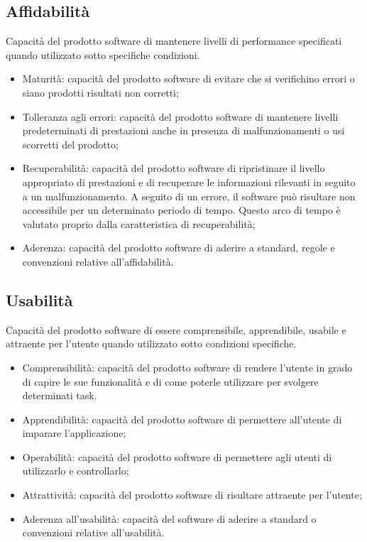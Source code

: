 \subsection{Affidabilità}
Capacità del prodotto software di mantenere livelli di performance specificati quando utilizzato sotto specifiche condizioni.

\begin{itemize}
    \item Maturità: capacità del prodotto software di evitare che si verifichino errori o siano prodotti risultati non corretti;
    \item Tolleranza agli errori: capacità del prodotto software di mantenere livelli predeterminati di prestazioni anche in presenza di malfunzionamenti o usi scorretti del prodotto;
    \item Recuperabilità: capacità del prodotto software di ripristinare il livello appropriato di prestazioni e di recuperare le informazioni rilevanti in seguito a un malfunzionamento. A seguito di un errore, il software può risultare non accessibile per un determinato periodo di tempo. Questo arco di tempo è valutato proprio dalla caratteristica di recuperabilità;
    \item Aderenza: capacità del prodotto software di aderire a standard, regole e convenzioni relative all'affidabilità.
\end{itemize}

\subsection{Usabilità}
Capacità del prodotto software di essere comprensibile, apprendibile, usabile e attraente per l'utente quando utilizzato sotto condizioni specifiche.

\begin{itemize}
    \item Comprensibilità: capacità del prodotto software di rendere l'utente in grado di capire le sue funzionalità e di come poterle utilizzare per svolgere determinati task.
    \item Apprendibilità: capacità del prodotto software di permettere all'utente di imparare l'applicazione;
    \item Operabilità: capacità del prodotto software di permettere agli utenti di utilizzarlo e controllarlo;
    \item Attrattività: capacità del prodotto software di risultare attraente per l'utente;
    \item Aderenza all'usabilità: capacità del software di aderire a standard o convenzioni relative all'usabilità.
\end{itemize}

